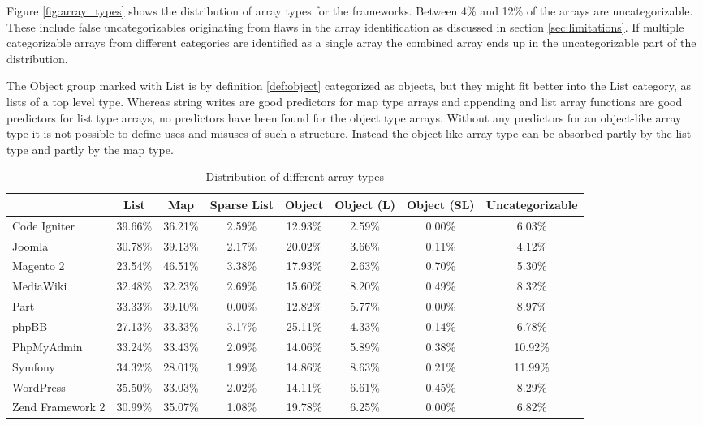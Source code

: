 Figure \ref{fig:array_types} shows the distribution of array types for the frameworks.  Between 4\% and 12\% of the arrays are uncategorizable. These include false uncategorizables originating from flaws in the array identification as discussed in section \ref{sec:limitations}. If multiple categorizable arrays from different categories are identified as a single array the combined array ends up in the uncategorizable part of the distribution.

The Object group marked with List is by definition \ref{def:object} categorized as objects, but they might fit better into the List category, as lists of a top level type. Whereas string writes are good predictors for map type arrays and appending and list array functions are good predictors for list type arrays, no predictors have been found for the object type arrays. Without any predictors for an object-like array type it is not possible to define uses and misuses of such a structure. Instead the object-like array type can be absorbed partly by the list type and partly by the map type.

\begin{table}[htbp]
\begin{adjustbox}{center}
\begin{tabular}{l | c c c c c c c}
    &   List    &   Map &   Sparse List &   Object  &   Object (L)   &   Object (SL)   &   Uncategorizable \\
\hline \hline
Code Igniter    &   39.66\% &   36.21\% &   2.59\%  &   12.93\% &   2.59\%  &   0.00\%  &   6.03\% \\
Joomla          &   30.78\% &   39.13\% &	2.17\%	&   20.02\% &	3.66\%	&   0.11\%  &   4.12\% \\
Magento 2	    &   23.54\% &   46.51\% &	3.38\%	&   17.93\% &	2.63\%	&   0.70\%  &   	5.30\% \\
MediaWiki	    &   32.48\%	&   32.23\% &	2.69\%	&   15.60\% &	8.20\%	&   0.49\%  &   	8.32\% \\
Part	        &   33.33\%	&   39.10\% &	0.00\%	&   12.82\% &	5.77\%	&   0.00\%  &   	8.97\% \\
phpBB	        &   27.13\%	&   33.33\% &	3.17\%	&   25.11\% &	4.33\%	&   0.14\%  &   	6.78\% \\
PhpMyAdmin	    &   33.24\%	&   33.43\% &	2.09\%	&   14.06\% &	5.89\%	&   0.38\%  &   	10.92\% \\
Symfony	        &   34.32\%	&   28.01\% &	1.99\%	&   14.86\% &	8.63\%	&   0.21\%  &   	11.99\% \\
WordPress	    &   35.50\%	&   33.03\% &	2.02\%	&   14.11\% &	6.61\%	&   0.45\%  &   	8.29\% \\
Zend Framework 2&	30.99\%	&   35.07\% &	1.08\%	&   19.78\% &	6.25\%	&   0.00\%  &   	6.82\% 
\end{tabular}
\end{adjustbox}
\caption{Distribution of different array types}
\label{tab:array_types}
\end{table}

